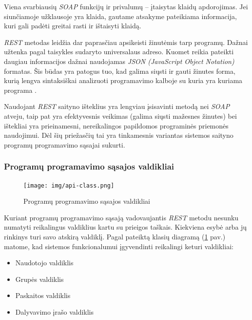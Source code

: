 \documentclass{VUMIFPSbakalaurinis}
\begin{document}
Viena svarbiausių \textit{SOAP} funkcijų ir privalumų – įtaisytas klaidų apdorojimas. Jei siunčiamoje užklausoje yra klaida, gautame atsakyme pateikiama informacija, kuri gali padėti greitai rasti ir ištaisyti klaidą.


\textit{REST} metodas leidžia dar paprasčiau apsikeisti žinutėmis tarp programų. Dažnai užtenka pagal taisykles sudaryto universalaus adreso. Kuomet reikia pateikti daugiau informacijos dažnai naudojamas \textit{JSON (JavaScript Object Notation)} formatas. Šis būdas yra patogus tuo, kad galima siųsti ir gauti žinutes forma, kurią lengva sintaksiškai analizuoti programavimo kalboje su kuria yra kuriama programa \cite{SoapRest}.

Naudojant \textit{REST} saityno išteklius yra lengviau įsisavinti metodą nei \textit{SOAP} atveju, taip pat yra efektyvesnis veikimas (galima siųsti mažesnes žinutes) bei ištekliai yra prieinamesni, nereikalingos papildomos programinės priemonės naudojimui. Dėl šių priežasčių tai yra tinkamesnis variantas sistemos saityno programų programavimo sąsajai sukurti.

\subsubsection{Programų programavimo sąsajos valdikliai}

\begin{figure}[H]
	\centering
	\texttt{[image: img/api-class.png]}
	\caption{Programų programavimo sąsajos valdikliai}
	\label{img:api-class-diagram}
\end{figure}

Kuriant programų programavimo sąsają vadovaujantis \textit{REST} metodu nesunku numatyti reikalingus valdiklius kartu su prieigos taškais. Kiekviena esybė arba jų rinkinys turi savo atskirą valdiklį. Pagal pateiktą klasių diagramą (\ref{img:api-class-diagram} pav.) matome, kad sistemos funkcionalumui įgyvendinti reikalingi keturi valdikliai:

\begin{itemize}
    \item Naudotojo valdiklis
    \item Grupės valdiklis
    \item Paskaitos valdiklis
    \item Dalyvavimo įrašo valdiklis
\end{itemize}

\end{document}
